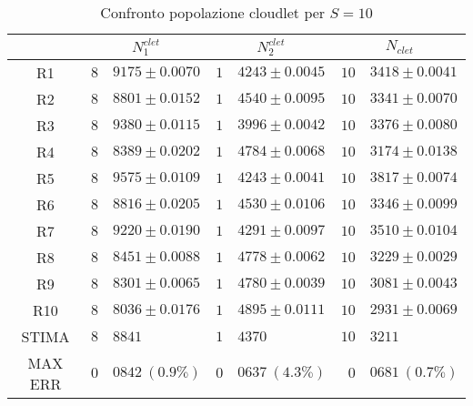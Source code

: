 \begin{table}[!h]
\begin{tabular}{c|r@{.}l|r@{.}l|r@{.}l}
& \multicolumn{2}{|c|}{$N_1^{clet}$}
& \multicolumn{2}{|c|}{$N_2^{clet}$}
& \multicolumn{2}{|c}{$N_{clet}$} 
\\          
\hline
R1      & $8$&$9175 \pm 0.0070$ & $1$&$4243 \pm 0.0045$ & $10$&$3418 \pm 0.0041$ \\
R2      & $8$&$8801 \pm 0.0152$ & $1$&$4540 \pm 0.0095$ & $10$&$3341 \pm 0.0070$ \\
R3      & $8$&$9380 \pm 0.0115$ & $1$&$3996 \pm 0.0042$ & $10$&$3376 \pm 0.0080$ \\
R4      & $8$&$8389 \pm 0.0202$ & $1$&$4784 \pm 0.0068$ & $10$&$3174 \pm 0.0138$ \\
R5      & $8$&$9575 \pm 0.0109$ & $1$&$4243 \pm 0.0041$ & $10$&$3817 \pm 0.0074$ \\
R6      & $8$&$8816 \pm 0.0205$ & $1$&$4530 \pm 0.0106$ & $10$&$3346 \pm 0.0099$ \\
R7      & $8$&$9220 \pm 0.0190$ & $1$&$4291 \pm 0.0097$ & $10$&$3510 \pm 0.0104$ \\
R8      & $8$&$8451 \pm 0.0088$ & $1$&$4778 \pm 0.0062$ & $10$&$3229 \pm 0.0029$ \\
R9      & $8$&$8301 \pm 0.0065$ & $1$&$4780 \pm 0.0039$ & $10$&$3081 \pm 0.0043$ \\
R10     & $8$&$8036 \pm 0.0176$ & $1$&$4895 \pm 0.0111$ & $10$&$2931 \pm 0.0069$ \\
STIMA   & $8$&$8841$            & $1$&$4370$            & $10$&$3211$            \\
MAX ERR & $0$&$0842 \ (0.9\%)$  & $0$&$0637 \ (4.3\%)$  & $0$&$0681 \ (0.7\%)$     
\end{tabular}
\centering
\caption{Confronto popolazione cloudlet per $S=10$}
\label{tab:10_nclet}
\end{table}

